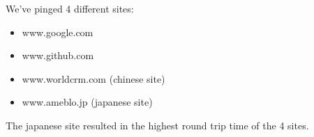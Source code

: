 We've pinged 4 different sites:
\begin{itemize}
	\item www.google.com
	\item www.github.com
	\item www.worldcrm.com (chinese site)
	\item www.ameblo.jp (japanese site)
\end{itemize}
The japanese site resulted in the highest round trip time of the 4 sites. \newline





